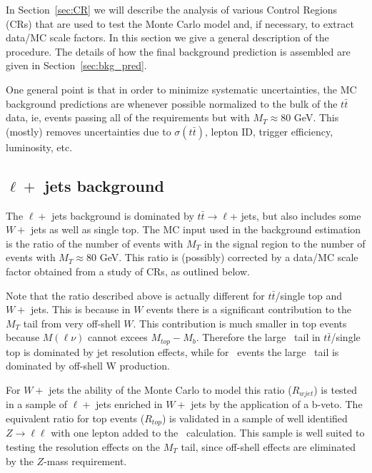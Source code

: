 In Section~\ref{sec:CR} we will describe the analysis of various Control Regions
(CRs)  that are used to test the Monte Carlo model and, if necessary,
to extract data/MC scale factors.  In this section we give a
general description of the procedure.  The details of how the
final background prediction is assembled are given in Section~\ref{sec:bkg_pred}.




One general point is that in order to minimize systematic uncertainties, the MC background
predictions are whenever possible normalized to the bulk of the $t\bar{t}$ data, ie, events passing all of the 
requirements but with $M_T \approx 80$ GeV.
This (mostly) removes uncertainties
due to $\sigma(t\bar{t})$, lepton ID, trigger efficiency, luminosity, etc.   

\subsection{$\ell +$ jets background}
\label{sec:ljbg-general}

The $\ell +$ jets background is dominated by 
$t\bar{t} \to \ell $+ jets, but also includes some $W +$ jets as well as single top.
The MC input used in the background estimation
is the ratio of the number of events with $M_T$ in the signal region
to the number of events with $M_T \approx 80$ GeV.
This ratio is (possibly) corrected by a data/MC scale factor obtained
from a study of CRs, as outlined below.

Note that the ratio described above is actually different for 
$t\bar{t}$/single top and $W +$ jets.  This is because in $W$ events
there is a significant contribution to the $M_T$ tail from very off-shell
$W$.
This contribution is much smaller in top events because $M(\ell \nu)$
cannot excees $M_{top}-M_b$. Therefore the large \mt\ tail in 
$t\bar{t}$/single top is dominated by jet resolution effects,
while for \wjets\ events the large \mt\ tail is dominated by off-shell W production.



For $W +$ jets the ability of the Monte Carlo to model this ratio
($R_{wjet}$) is tested in a sample of $\ell +$ jets enriched in 
$W +$ jets by the application of a b-veto.
The equivalent ratio for top events ($R_{top}$) is validated in a sample of well
identified $Z \to \ell \ell$ with one lepton added to the \met\
calculation.
This sample is well suited to testing the resolution effects on 
the $M_T$ tail, since off-shell effects are eliminated by the $Z$-mass
requirement.

